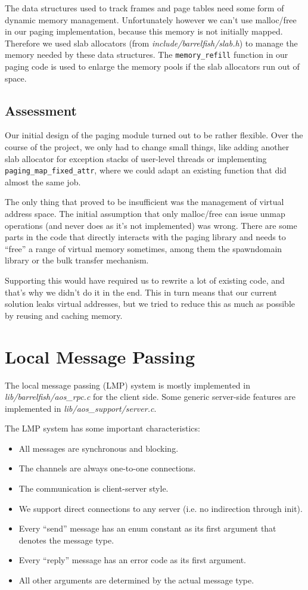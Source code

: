 \documentclass[a4paper,10pt]{article}
\newcommand{\filepath}[1]{\emph{ #1}}
\begin{document}
The data structures used to track frames and page tables need some form of dynamic memory management.
Unfortunately however we can't use malloc/free in our paging implementation, because this memory is not initially mapped.
Therefore we used slab allocators (from \filepath{include/barrelfish/slab.h}) to manage the memory needed by these data structures.
The \lstinline!memory_refill! function in our paging code is used to enlarge the memory pools if the slab allocators run out of space.

\subsection{Assessment}

Our initial design of the paging module turned out to be rather flexible.
Over the course of the project, we only had to change small things, like adding another slab allocator for exception stacks of user-level threads 
or implementing \lstinline!paging_map_fixed_attr!, where we could adapt an existing function that did almost the same job.

The only thing that proved to be insufficient was the management of virtual address space.
The initial assumption that only malloc/free can issue unmap operations (and never does as it's not implemented) was wrong.
There are some parts in the code that directly interacts with the paging library and needs to ``free'' a range of virtual memory sometimes, among them the spawndomain library or the bulk transfer mechanism.

Supporting this would have required us to rewrite a lot of existing code, and that's why we didn't do it in the end.
This in turn means that our current solution leaks virtual addresses, but we tried to reduce this as much as possible by reusing and caching memory.

\section{Local Message Passing}

The local message passing (LMP) system is mostly implemented in \filepath{lib/barrelfish/aos\_rpc.c} for the client side.
Some generic server-side features are implemented in \filepath{lib/aos\_support/server.c}.

The LMP system has some important characteristics:
\begin{itemize}
 \item All messages are synchronous and blocking.
 \item The channels are always one-to-one connections.
 \item The communication is client-server style.
 \item We support direct connections to any server (i.e. no indirection through init).
 \item Every ``send'' message has an enum constant as its first argument that denotes the message type.
 \item Every ``reply'' message has an error code as its first argument.
 \item All other arguments are determined by the actual message type.
\end{itemize}
\end{document}
